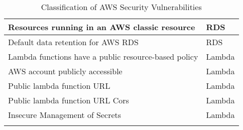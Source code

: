 \begin{longtable}{|p{10cm}|p{2.4cm}|}
    Resources running in an AWS classic resource & RDS \\
    \hline
    Default data retention for AWS RDS & RDS \\
    \hline
    Lambda functions have a public resource-based policy & Lambda \\
    \hline
    AWS account publicly accessible & Lambda \\
    \hline
    Public lambda function URL & Lambda \\
    \hline
    Public lambda function URL Cors & Lambda \\
    \hline
    Insecure Management of Secrets & Lambda \\
    \hline
    \caption{Classification of AWS Security Vulnerabilities}
    \label{tab:classificationofsecurityvulnerabilities}
\end{longtable}









